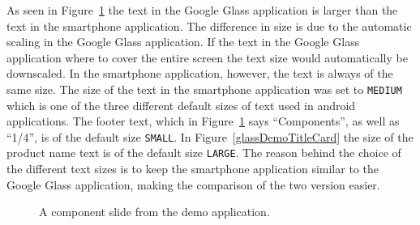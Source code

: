 As seen in Figure~\ref{glassDemoComponentText} the text in the Google Glass application is larger than the text in the smartphone application. The difference in size is due to the automatic scaling in the Google Glass application. If the text in the Google Glass application where to cover the entire screen the text size would automatically be downscaled. In the smartphone application, however, the text is always of the same size. The size of the text in the smartphone application was set to \texttt{MEDIUM} which is one of the three different default sizes of text used in android applications. The footer text, which in Figure~\ref{glassDemoComponentText} says ``Components'', as well as ``1/4'', is of the default size \texttt{SMALL}. In Figure~\ref{glassDemoTitleCard} the size of the product name text is of the default size \texttt{LARGE}. The reason behind the choice of the different text sizes is to keep the smartphone application similar to the Google Glass application, making the comparison of the two version easier.

		\begin{figure}[ht!]
		\centering
   		 \qquad
   		 \qquad
		\caption{A component slide from the demo application.}
		\label{glassDemoComponentText}
	\end{figure}

